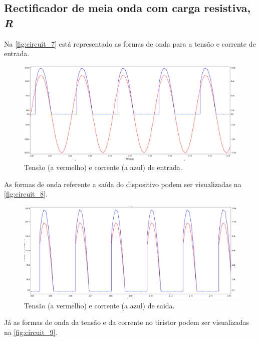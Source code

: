 \documentclass[a4paper,11pt]{article}
\numberwithin{equation}{section}
\begin{document}
\pagebreak
\subsection{Rectificador de meia onda com carga resistiva, \textit{R}}

	Na \autoref{fig:circuit_7}  está representado as formas de onda para a tensão e corrente de entrada.

\begin{figure}[h]
	\centering
	\includegraphics[keepaspectratio=true, scale=0.3]{img/circuito5}
	\caption{Tensão (a vermelho) e corrente (a azul) de entrada.}
	\label{fig:circuit_7}
	\vspace{-0.8em}
\end{figure}

As formas de onda referente a saída do dispositivo podem ser visualizadas na \autoref{fig:circuit_8}.

\begin{figure}[h]
	\centering
	\includegraphics[keepaspectratio=true, scale=0.3]{img/circuito6}
	\caption{Tensão (a vermelho) e corrente (a azul) de saida.}
	\label{fig:circuit_8}
	\vspace{-0.8em}
\end{figure}

Já as formas de onda da tensão e da corrente no tiristor podem ser visualizadas na  \autoref{fig:circuit_9}.
\end{document}

